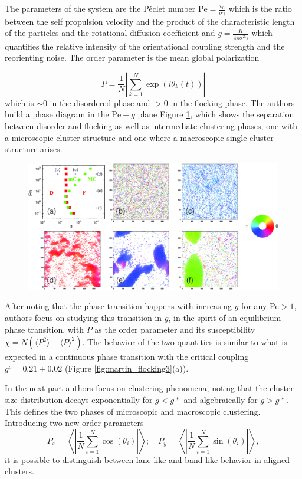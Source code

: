 \documentclass[../../master_thesis_np.tex]{subfiles}
\begin{document}
		The parameters of the system are the Péclet number $\mathrm{Pe} = \frac{v_0}{\sigma \gamma}$ which is the ratio between the self propulsion velocity and the product of the characteristic length of the particles and the rotational diffusion coefficient and $g = \frac{K}{4\pi \sigma^2 \gamma}$ which quantifies the relative intensity of the orientational coupling strength and the reorienting noise. The order parameter is the mean global polarization
		
    	\[ P = \frac{1}{N}\left| \sum_{k=1}^{N} \exp{(i \theta_k(t))} \right|\]
    	 which is $\sim 0$ in the disordered phase and $> 0$ in the flocking phase. The authors build a phase diagram in the $\mathrm{Pe}-g$ plane Figure \ref{fig:martin_flocking1}, which shows the separation between disorder and flocking as well as intermediate clustering phases, one with a microscopic cluster structure and one where a macroscopic single cluster structure arises.
		
		\begin{figure}[h]
			\centering
			\includegraphics[width=\textwidth]{martin_phaseseparation.png}
			\caption{\cite{martin-gomez_collective_2018}}
			\label{fig:martin_flocking1}
		\end{figure}
		
		After noting that the phase transition happens with increasing $g$ for any $\mathrm{Pe} > 1$, authors focus on studying this transition in $g$, in the  spirit of an equilibrium phase transition, with $P$ as the order parameter and its susceptibility $\chi = N(\langle P^2 \rangle - \langle P \rangle^2)$. The behavior of the two quantities is similar to what is expected in a continuous phase transition with the critical coupling $g^c = 0.21 \pm 0.02$ (Figure \ref{fig:martin_flocking3}(a)).
		
		In the next part authors focus on clustering phenomena, noting that the cluster size distribution decays exponentially for $g < g*$ and algebraically for $g > g*$. This defines the two phases of microscopic and macroscopic clustering.
		Introducing two new order parameters
		\[ P_x = \left\langle \left| \frac{1}{N} \sum_{i=1}^N \cos(\theta_i) \right| \right\rangle ; \quad
		P_y = \left\langle \left| \frac{1}{N} \sum_{i=1}^N \sin(\theta_i) \right| \right\rangle,
		 \]
		 it is possible to distinguish between lane-like and band-like behavior in aligned clusters.
		 
\end{document}
